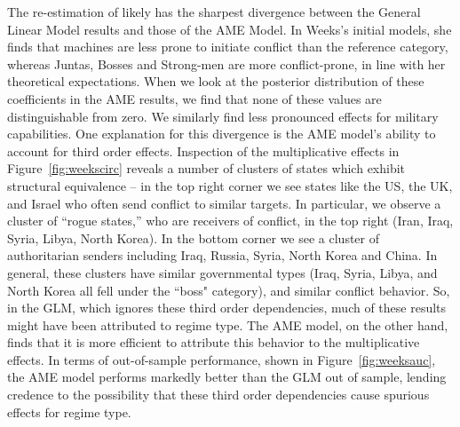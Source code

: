 The re-estimation of \citet{weeks:2012} likely has the sharpest divergence between the General Linear Model results and those of the AME Model. In Weeks's initial models,  she finds that machines are less prone to initiate conflict than the reference category, whereas Juntas, Bosses and Strong-men are more conflict-prone, in line with her theoretical expectations. When we look at the posterior distribution of these coefficients in the AME results, we find that none of these values are distinguishable from zero. We similarly find less pronounced effects for military capabilities. One explanation for this divergence is the AME model's ability to account for third order effects. Inspection of the multiplicative effects in Figure~\ref{fig:weekscirc} reveals a number of clusters of states which exhibit structural equivalence -- in the top right corner we see states like the US, the UK, and Israel who often send conflict to similar targets. In particular, we observe a cluster of ``rogue states,'' who are receivers of conflict, in the top right (Iran, Iraq, Syria, Libya, North Korea). In the bottom corner we see a cluster of authoritarian senders including Iraq, Russia, Syria, North Korea and China. In general, these clusters have similar governmental types (Iraq, Syria, Libya, and North Korea all fell under the ``boss" category), and similar conflict behavior. So, in the GLM, which ignores these third order dependencies, much of these results might have been attributed to regime type. The AME model, on the other hand, finds that it is more efficient to attribute this behavior to the multiplicative effects. In terms of out-of-sample performance, shown in Figure~\ref{fig:weeksauc}, the AME model performs markedly better than the GLM out of sample, lending credence to the possibility that these third order dependencies cause spurious effects for regime type.

